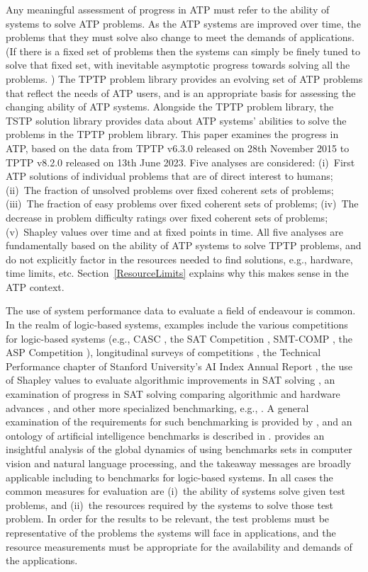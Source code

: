 \documentclass[runningheads]{llncs}
\begin{document}
Any meaningful assessment of progress in ATP must refer to the ability of systems to solve 
ATP problems.
As the ATP systems are improved over time, the problems that they must solve also change to meet 
the demands of applications.
(If there is a fixed set of problems then the systems can simply be finely tuned to solve that
fixed set, with inevitable asymptotic progress towards solving all the problems. \cite{OB+22})
The TPTP problem library provides an evolving set of ATP problems that reflect the needs of 
ATP users, and is an appropriate basis for assessing the changing ability of ATP systems.
Alongside the TPTP problem library, the TSTP solution library provides data about ATP 
systems' abilities to solve the problems in the TPTP problem library.
This paper examines the progress in ATP, based on the data from TPTP v6.3.0 released on 
28th November 2015 to TPTP v8.2.0 released on 13th June 2023.
Five analyses are considered:
(i)~First ATP solutions of individual problems that are of direct interest to humans;
(ii)~The fraction of unsolved problems over fixed coherent sets of problems;
(iii)~The fraction of easy problems over fixed coherent sets of problems;
(iv)~The decrease in problem difficulty ratings over fixed coherent sets of problems;
(v)~Shapley values over time and at fixed points in time.
All five analyses are fundamentally based on the ability of ATP systems to solve TPTP problems, and 
do not explicitly factor in the resources needed to find solutions, e.g., hardware, time limits, 
etc. 
Section~\ref{ResourceLimits} explains why this makes sense in the ATP context.

The use of system performance data to evaluate a field of endeavour is common.
In the realm of logic-based systems, examples include
the various competitions \cite{BB+19} for logic-based systems (e.g., CASC \cite{Sut16}, the SAT 
Competition \cite{JL+12}, SMT-COMP \cite{BdS05}, the ASP Competition \cite{CI+12}),
longitudinal surveys of competitions \cite{SS06-SoCASC,CSW15},
the Technical Performance chapter of Stanford University's AI Index Annual Report \cite{MF+23},
the use of Shapley values to evaluate algorithmic improvements in SAT solving \cite{FK+16,KF+19},
an examination of progress in SAT solving comparing algorithmic and hardware advances \cite{FHS20},
and
other more specialized benchmarking, e.g., \cite{ZHP22}.
A general examination of the requirements for such benchmarking is provided by \cite{BLW19}, and
an ontology of artificial intelligence benchmarks is described in \cite{BB+22-SD}.
\cite{OB+22} provides an insightful analysis of the global dynamics of using benchmarks sets in
computer vision and natural language processing, and the takeaway messages are broadly applicable 
including to benchmarks for logic-based systems.
In all cases the common measures for evaluation are (i)~the ability of systems solve given test
problems, and (ii)~the resources required by the systems to solve those test problem.
In order for the results to be relevant, the test problems must be representative of the problems
the systems will face in applications, and the resource measurements must be appropriate for 
the availability and demands of the applications.
\end{document}
